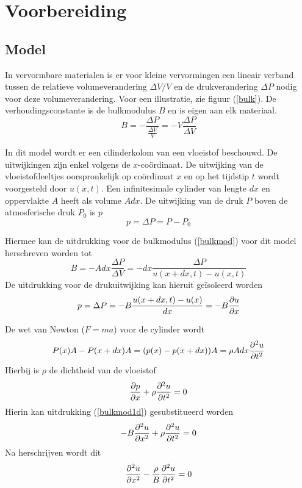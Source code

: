 \section{Voorbereiding}
\subsection{Model}

In vervormbare materialen is er voor kleine vervormingen een lineair 
verband tussen de relatieve volumeverandering $\Delta V/V$ en de 
drukverandering $\Delta P$ nodig voor deze volumeverandering. Voor een 
illustratie, zie figuur (\ref{bulk}).  De verhoudingsconstante is de 
bulkmodulus $B$ en is eigen aan elk materiaal.
\begin{equation}
\label{bulkmod}
B = -\frac{\Delta P}{\frac{\Delta V}{V}} = - V \frac{\Delta P}{\Delta V}
\end{equation}

In dit model wordt er een cilinderkolom van een vloeistof beschouwd. De 
uitwijkingen zijn enkel volgens de $x$-co\"ordinaat. De uitwijking van de 
vloeistofdeeltjes oorspronkelijk op co\"ordinaat $x$ en op het tijdstip $t$ 
wordt voorgesteld door $u(x,t)$. Een infinitesimale cylinder van lengte $dx$ en 
oppervlakte $A$ heeft als volume $A dx$.  De uitwijking van de druk $P$ boven 
de atmosferische druk $P_0$ is $p$
$$
p = \Delta P = P - P_0
$$

Hiermee kan de uitdrukking voor de bulkmodulus (\ref{bulkmod}) voor dit model 
herschreven worden tot
$$
B = -A dx \frac{\Delta P}{\Delta V} = -dx \frac{\Delta P}{ u(x+dx,t)-u(x,t)}
$$
De uitdrukking voor de drukuitwijking kan hieruit ge\"isoleerd worden
\begin{equation}
\label{bulkmod1d}
p = \Delta P = -B \frac{u(x+dx,t)-u(x)}{dx} = -B \frac{\partial u}{\partial x}
\end{equation}

De wet van Newton ($F = ma$) voor de cylinder wordt
$$
P(x)A - P(x+dx)A = (p(x) - p(x+dx))A = \rho A dx \frac{\partial^2 u}{\partial t^2}
$$
Hierbij is $\rho$ de dichtheid van de vloeistof
$$
\frac{\partial p}{\partial x} + \rho \frac{\partial^2 u}{\partial t^2} = 0
$$
Hierin kan uitdrukking (\ref{bulkmod1d}) gesubstitueerd worden
$$
-B\frac{\partial^2 u}{\partial x^2} + \rho \frac{\partial^2 u}{\partial t^2} = 0
$$
Na herschrijven wordt dit
\begin{equation}
\label{waveeq}
\frac{\partial^2 u}{\partial x^2} - \frac{\rho}{B} \frac{\partial^2 u}{\partial t^2} = 0
\end{equation}


